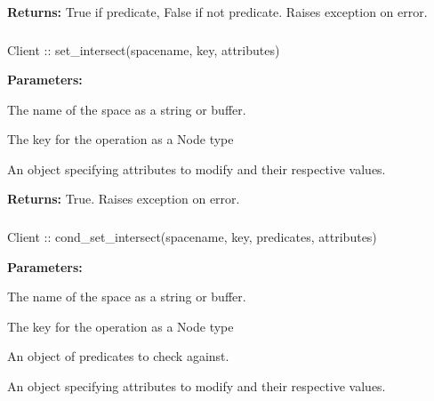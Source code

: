 \noindent\textbf{Returns:}
True if predicate, False if not predicate.  Raises exception on error.

\subsubsection{}
\label{api:nodejs:set_intersect}
\begin{javascriptcode}
Client :: set_intersect(spacename, key, attributes)
\end{javascriptcode}
\funcdesc 

\noindent\textbf{Parameters:}
\begin{description}[labelindent=\widthof{{\code{attributes}}},leftmargin=*,noitemsep,nolistsep,align=right]
\item[\code{spacename}] The name of the space as a string or buffer.
\item[\code{key}] The key for the operation as a Node type
\item[\code{attributes}] An object specifying attributes to modify and their respective values.
\end{description}

\noindent\textbf{Returns:}
True.  Raises exception on error.

\subsubsection{}
\label{api:nodejs:cond_set_intersect}
\begin{javascriptcode}
Client :: cond_set_intersect(spacename, key, predicates, attributes)
\end{javascriptcode}
\funcdesc 

\noindent\textbf{Parameters:}
\begin{description}[labelindent=\widthof{{\code{predicates}}},leftmargin=*,noitemsep,nolistsep,align=right]
\item[\code{spacename}] The name of the space as a string or buffer.
\item[\code{key}] The key for the operation as a Node type
\item[\code{predicates}] An object of predicates to check against.
\item[\code{attributes}] An object specifying attributes to modify and their respective values.
\end{description}

